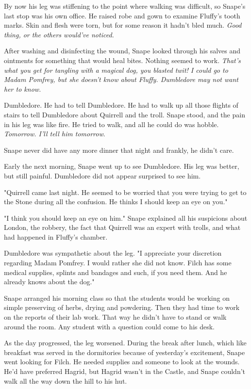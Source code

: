 \documentclass[a4paper,11pt]{article}
\begin{document}
By now his leg was stiffening to the point where walking was difficult, so Snape's last stop was his own office. He raised robe and gown to examine Fluffy's tooth marks. Skin and flesh were torn, but for some reason it hadn't bled much. \emph{Good thing, or the others would've noticed.}

After washing and disinfecting the wound, Snape looked through his salves and ointments for something that would heal bites. Nothing seemed to work. \emph{That's what you get for tangling with a magical dog, you blasted twit! I could go to Madam Pomfrey, but she doesn't know about Fluffy. Dumbledore may not want her to know.}

Dumbledore. He had to tell Dumbledore. He had to walk up all those flights of stairs to tell Dumbledore about Quirrell and the troll. Snape stood, and the pain in his leg was like fire. He tried to walk, and all he could do was hobble. \emph{Tomorrow. I'll tell him tomorrow}.

Snape never did have any more dinner that night and frankly, he didn't care.

Early the next morning, Snape went up to see Dumbledore. His leg was better, but still painful. Dumbledore did not appear surprised to see him.

"Quirrell came last night. He seemed to be worried that you were trying to get to the Stone during all the confusion. He thinks I should keep an eye on you."

"I think you should keep an eye on him." Snape explained all his suspicions about London, the robbery, the fact that Quirrell was an expert with trolls, and what had happened in Fluffy's chamber.

Dumbledore was sympathetic about the leg. "I appreciate your discretion regarding Madam Pomfrey. I would rather she did not know. Filch has some medical supplies, splints and bandages and such, if you need them. And he already knows about the dog."

Snape arranged his morning class so that the students would be working on simple preserving of herbs, drying and powdering. Then they had time to work on the reports of their lab work. That way he didn't have to stand or walk around the room. Any student with a question could come to his desk.

As the day progressed, the leg worsened. During the break after lunch, which like breakfast was served in the dormitories because of yesterday's excitement, Snape went looking for Filch. He needed supplies and someone to look at the wounds. He'd have preferred Hagrid, but Hagrid wasn't in the Castle, and Snape couldn't walk all the way down the hill to his hut.
\end{document}
